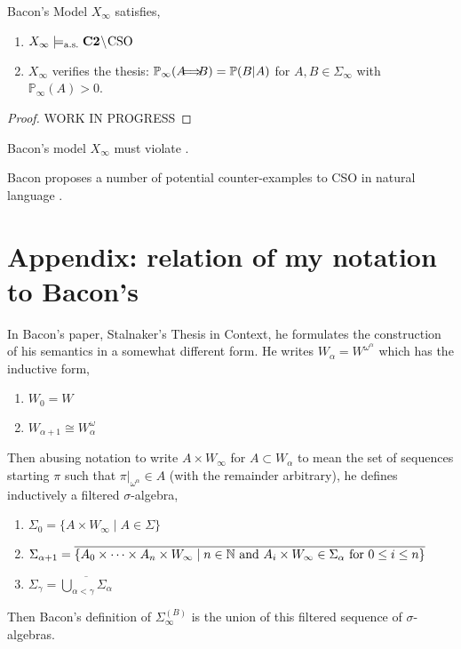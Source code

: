 \documentclass[12pt]{article}
\renewcommand{\P}{\mathbb{P}}
\newcommand{\as}{\mathrm{a.s.}}
\let\oldimplies\implies
\renewcommand{\implies}{\hspace{-1ex} \oldimplies \hspace{-1ex}}
\begin{document}
\begin{theorem}
Bacon's Model $X_{\infty}$ satisfies,
\begin{enumerate}
\item $X_{\infty} \entails_{\as} \textbf{C2} \sm \text{CSO}$
\item $X_{\infty}$ verifies the thesis: $\P_\infty(A \implies B) = \P(B | A)$ for $A, B \in \Sigma_{\infty}$ with $\P_\infty(A) > 0$.
\end{enumerate}
\end{theorem}

\begin{proof}
WORK IN PROGRESS
\end{proof}

\begin{cor}
Bacon's model $X_{\infty}$ must violate . 
\end{cor}

\begin{rmk}
Bacon proposes a number of potential counter-examples to CSO in natural language \cite{Bacon}.
\end{rmk}


\section{Appendix: relation of my notation to Bacon's}

In Bacon's paper, Stalnaker's Thesis in Context, he formulates the construction of his semantics in a somewhat different form. He writes $W_\alpha = W^{\omega^\alpha}$ which has the inductive form,
\begin{enumerate}
\item $W_0 = W$
\item $W_{\alpha+1} \cong W_\alpha^\omega$
\end{enumerate} 
Then abusing notation to write $A \times W_{\infty}$ for $A \subset W_{\alpha}$ to mean the set of sequences starting $\pi$ such that $\pi|_{\omega^\alpha} \in A$ (with the remainder arbitrary), he defines inductively a filtered $\sigma$-algebra,
\begin{enumerate}
\item $\Sigma_0 = \{ A \times W_{\infty} \mid A \in \Sigma \}$
\item $\Sigma_{\alpha + 1} = \overline{\{ A_0 \times \cdots \times A_n \times W_{\infty} \mid n \in \mathbb{N} \text{ and } A_i \times W_{\infty} \in \Sigma_{\alpha} \text{ for } 0 \le i \le n \}}$
\item $\Sigma_{\gamma} = \overline{ \bigcup_{\alpha < \gamma} \Sigma_\alpha}$
\end{enumerate}
Then Bacon's definition of $\Sigma_{\infty}^{(B)}$ is the union of this filtered sequence of $\sigma$-algebras.
\end{document}
